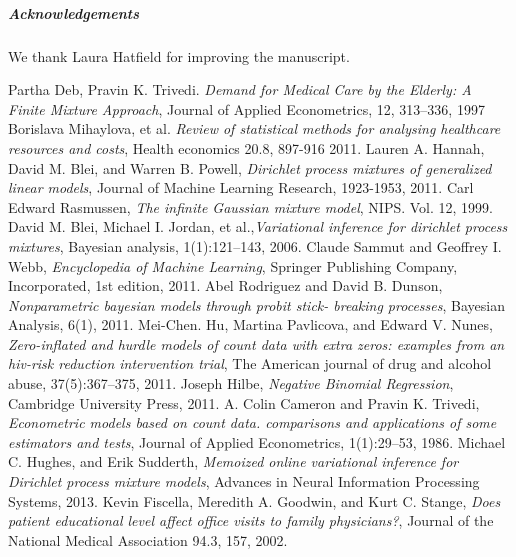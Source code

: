 \documentclass[a4paper,UKenglish]{oasics}
\begin{document}
\subparagraph*{Acknowledgements}

We thank Laura Hatfield for improving the manuscript.

\appendix





%



\begin{thebibliography}{50}
 Partha Deb, Pravin K. Trivedi. \textsl{Demand for Medical Care by the Elderly: A Finite Mixture
Approach}, Journal of Applied Econometrics, 12, 313–336, 1997
 Borislava Mihaylova, et al. \textsl{Review of statistical methods for analysing healthcare resources and costs}, Health economics 20.8, 897-916 2011.
Lauren A. Hannah, David M. Blei, and Warren B. Powell, \textsl{Dirichlet process mixtures of generalized linear models}, Journal of Machine Learning Research, 1923-1953, 2011.
 Carl Edward Rasmussen, \textsl{The infinite Gaussian mixture model}, NIPS. Vol. 12, 1999.
 David M. Blei, Michael I. Jordan, et al.,\textsl{Variational inference for dirichlet process mixtures}, Bayesian
analysis, 1(1):121–143, 2006.
 Claude Sammut and Geoffrey I. Webb, \textsl{Encyclopedia of Machine Learning}, Springer Publishing
Company, Incorporated, 1st edition, 2011.
 Abel Rodriguez and David B. Dunson, \textsl{Nonparametric bayesian models through probit stick-
breaking processes}, Bayesian Analysis, 6(1), 2011.
 Mei-Chen. Hu, Martina Pavlicova, and Edward V. Nunes, \textsl{Zero-inflated and hurdle models of count data
with extra zeros: examples from an hiv-risk reduction intervention trial}, The American
journal of drug and alcohol abuse, 37(5):367–375, 2011.
 Joseph Hilbe, \textsl{Negative Binomial Regression}, Cambridge University Press, 2011.
 A. Colin Cameron and Pravin K. Trivedi, \textsl{Econometric models based on count data. comparisons
and applications of some estimators and tests}, Journal of Applied Econometrics, 1(1):29–53,
1986.
 Michael C. Hughes, and Erik Sudderth, \textsl{Memoized online variational inference for Dirichlet process mixture models}, Advances in Neural Information Processing Systems, 2013.
 Kevin Fiscella, Meredith A. Goodwin, and Kurt C. Stange, \textsl{Does patient educational level affect office visits to family physicians?}, Journal of the National Medical Association 94.3, 157, 2002.
\end{thebibliography}
\end{document}
